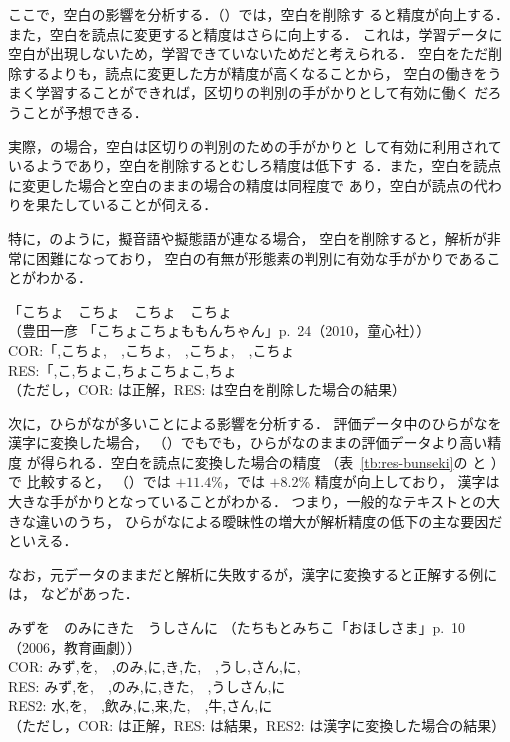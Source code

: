 \documentclass[japanese]{jnlp_1.4}
\newcommand{\mecab}{}
\newcommand{\kytea}{}
\newcommand{\Sp}{}
\newcommand{\HanSp}{}
\newcommand{\Def}{}
\newcommand{\refs}[1]{}
\newcommand{\ul}{}
\newcommand{\pos}[1]{}
\begin{document}
ここで，空白の影響を分析する．\kytea（\Def）では，空白を削除す
ると精度が向上する．また，空白を読点に変更すると精度はさらに向上する．
これは，学習データに空白が出現しないため，学習できていないためだと考えられる．
空白をただ削除するよりも，読点に変更した方が精度が高くなることから，
空白の働きをうまく学習することができれば，区切りの判別の手がかりとして有効に働く
だろうことが予想できる．

実際，\mecab の場合，空白は区切りの判別のための手がかりと
して有効に利用されているようであり，空白を削除するとむしろ精度は低下す
る．また，空白を読点に変更した場合と空白のままの場合の精度は同程度で
あり，空白が読点の代わりを果たしていることが伺える．


特に，\refs{err-del}のように，擬音語や擬態語が連なる場合，
空白を削除すると，解析が非常に困難になっており，
空白の有無が形態素の判別に有効な手がかりであることがわかる．
 \begin{exe} 
 \ex \label{s:err-del}
  「こちょ　こちょ　こちょ　こちょ \\
 {\small （豊田一彦 「こちょこちょももんちゃん」p.~24（2010，童心社））}\\
  COR:「,\ul{こちょ,　,こちょ,　,こちょ,　,こちょ}\\
  RES:「,\ul{こ,ちょこ,ちょこちょこ,ちょ}\\
 \small （ただし，COR: は正解，RES: は空白を削除した場合の結果）
 \end{exe} 

次に，ひらがなが多いことによる影響を分析する．
評価データ中のひらがなを漢字に変換した場合，
\kytea（\Def）でも\mecab でも，ひらがなのままの評価データより高い精度
が得られる．空白を読点に変換した場合の精度
（表~\ref{tb:res-bunseki}の
\pos{\Sp\ \refs{eva-punc}}と
\pos{\HanSp\ \refs{eva-hanpunc}}）で
比較すると，
\kytea（\Def）では $+11.4$\%，\mecab では $+8.2$\% 精度が向上しており，
漢字は大きな手がかりとなっていることがわかる．
つまり，一般的なテキストとの大きな違いのうち，
ひらがなによる曖昧性の増大が解析精度の低下の主な要因だといえる．


なお，元データのままだと解析に失敗するが，漢字に変換すると正解する例には，
\refs{err-org}などがあった．
 \begin{exe}
 \ex \label{s:err-org}
  みずを　のみにきた　うしさんに \hfill
{\small （たちもとみちこ「おほしさま」p.~10（2006，教育画劇））}\\
COR: みず,を,　,のみ,に,き,た,　,うし,さん,に,\\
RES: みず,を,　,のみ,に,\ul{きた},　,\ul{うしさん},に\\
RES2: 水,を,　,飲み,に,\ul{来,た},　,\ul{牛,さん},に\\
\small （ただし，COR: は正解，RES: は結果，RES2: は漢字に変換した場合の結果）
 \end{exe} 
\end{document}
